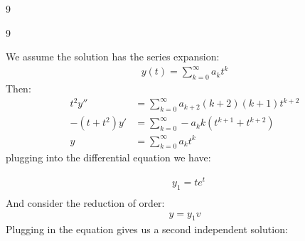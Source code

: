 \begin{vv286}{9}
\begin{vv286_ms}{9}
   \item[(iii)]
   We assume the solution has the series expansion:
      \begin{align*}
	y(t)=\sum_{k=0}^{\infty}a_kt^k
      \end{align*}
      Then:
      \begin{align*}
	t^2y''&=\sum_{k=0}^{\infty}a_{k+2}(k+2)(k+1)t^{k+2}\\
	-(t+t^2) y'&=\sum_{k=0}^{\infty}-a_kk(t^{k+1}+t^{k+2})\\
	y&=\sum_{k=0}^{\infty} a_k t^k
      \end{align*}
      plugging into the differential equation we have:

      \begin{align*}
       &y_1=te^t\\
      \end{align*}
     And consider the reduction of order:
      \begin{align*}
	y=y_1v
      \end{align*}
      Plugging in the equation gives us a second independent solution:
    \end{vv286_ms}
\end{vv286}


